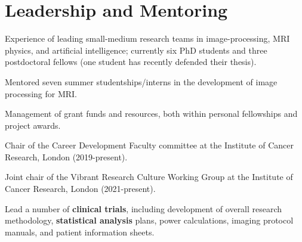 \documentclass[]{mbcv}
\begin{document}
\section{Leadership and Mentoring}
\vspace*{10pt}
\begin{tightemize}
\item Experience of leading small-medium research teams in image-processing, MRI physics, and artificial intelligence; currently six PhD students and three postdoctoral fellows (one student has recently defended their thesis).
\item Mentored seven summer studentships/interns in the development of image processing for MRI.
\item Management of grant funds and resources, both within personal fellowships and project awards.
\item Chair of the Career Development Faculty committee at the Institute of Cancer Research, London (2019-present).
\item Joint chair of the Vibrant Research Culture Working Group at the Institute of Cancer Research, London (2021-present). 
\item Lead a number of \textbf{clinical trials}, including development of overall research methodology, \textbf{statistical analysis} plans, power calculations, imaging protocol manuals, and patient information sheets. 

\end{tightemize}
\sectionsep
\end{document}
